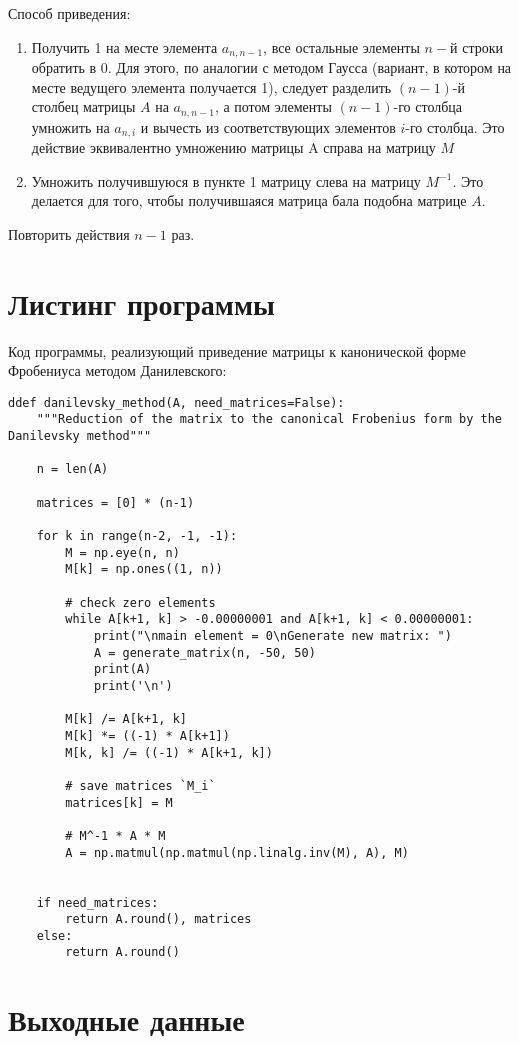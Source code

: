 \documentclass[12pt]{report}
\begin{document}
Способ приведения:
\begin{enumerate}
    \item Получить 1 на месте элемента $a_{n, n-1}$, все остальные элементы $n-й$ строки
обратить в 0.
Для этого, по аналогии с методом Гаусса (вариант, в котором на месте
ведущего элемента получается 1), следует разделить $(n-1)$-й столбец матрицы
$A$ на $a_{n,n-1}$, а потом элементы $(n-1)$-го столбца умножить на $a_{n,i}$ и вычесть из
соответствующих элементов $i$-го столбца. Это действие эквивалентно
умножению матрицы A справа на матрицу $M$
    \item Умножить получившуюся в пункте 1 матрицу слева на матрицу $M^{-1}$. Это делается для того, чтобы получившаяся матрица бала подобна матрице $A$.
\end{enumerate}
Повторить действия $n-1$ раз.

\section{Листинг программы}

\lstset{language=Python}
\lstset{extendedchars=\true}

Код программы, реализующий приведение матрицы к канонической форме Фробениуса методом Данилевского: 

\begin{lstlisting}
ddef danilevsky_method(A, need_matrices=False):
	"""Reduction of the matrix to the canonical Frobenius form by the Danilevsky method"""

	n = len(A)
	
	matrices = [0] * (n-1)

	for k in range(n-2, -1, -1):
		M = np.eye(n, n)
		M[k] = np.ones((1, n))

		# check zero elements
		while A[k+1, k] > -0.00000001 and A[k+1, k] < 0.00000001:
			print("\nmain element = 0\nGenerate new matrix: ")
			A = generate_matrix(n, -50, 50)
			print(A)
			print('\n')

		M[k] /= A[k+1, k]
		M[k] *= ((-1) * A[k+1])
		M[k, k] /= ((-1) * A[k+1, k])

		# save matrices `M_i`
		matrices[k] = M

		# M^-1 * A * M
		A = np.matmul(np.matmul(np.linalg.inv(M), A), M)


	if need_matrices:
		return A.round(), matrices
	else:
		return A.round()
\end{lstlisting}

\section{Выходные данные}
\end{document}
